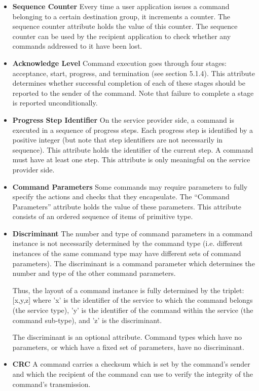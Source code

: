 \begin{itemize}
\item \textbf{Sequence Counter}
Every time a user application issues a command belonging to a certain destination group, it increments a counter. The sequence counter attribute holds the value of this counter. The sequence counter can be used by the recipient application to check whether any commands addressed to it have been lost. 

\item \textbf{Acknowledge Level}
Command execution goes through four stages: acceptance, start, progress, and termination (see section 5.1.4). This attribute determines whether successful completion of each of these stages should be reported to the sender of the command. Note that failure to complete a stage is reported unconditionally.

\item \textbf{Progress Step Identifier}
On the service provider side, a command is executed in a sequence of progress steps. Each progress step is identified by a positive integer (but note that step identifiers are not necessarily in sequence). This attribute holds the identifier of the current step. A command must have at least one step. This attribute is only meaningful on the service provider side.

\item \textbf{Command Parameters}
Some commands may require parameters to fully specify the actions and checks that they encapsulate. The “Command Parameters” attribute holds the value of these parameters. This attribute consists of an ordered sequence of items of primitive type. 

\item \textbf{Discriminant}
The number and type of command parameters in a command instance is not necessarily determined by the command type (i.e. different instances of the same command type may have different sets of command parameters). The discriminant is a command parameter which determines the number and type of the other command parameters. 

Thus, the layout of a command instance is fully determined by the triplet: [x,y,z] where 'x' is the identifier of the service to which the command belongs (the service type), 'y' is the identifier of the command within the service (the command sub-type), and 'z' is the discriminant. 

The discriminant is an optional attribute. Command types which have no parameters, or which have a fixed set of parameters, have no discriminant.

\item \textbf{CRC}
A command carries a checksum which is set by the command's sender and which the recipient of the command can use to verify the integrity of the command's transmission. 
\end{itemize}

